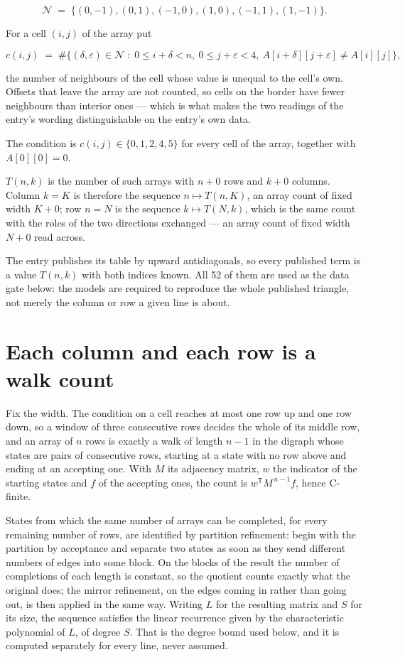 \documentclass[11pt]{article}
\theoremstyle{definition}
\begin{document}
\[\mathcal{N} \;=\; \{(0,-1), (0,1), (-1,0), (1,0), (-1,1), (1,-1)\}.\]

For a cell $(i,j)$ of the array put

\[c(i,j) \;=\; \#\bigl\{(\delta,\varepsilon)\in\mathcal{N} \;:\; 0\le i+\delta<n,\ 0\le j+\varepsilon<4,\ A[i+\delta][j+\varepsilon] \neq A[i][j]\bigr\},\]

the number of neighbours of the cell whose value is unequal to the cell's own. Offsets that leave the array are not counted, so cells on the border have fewer neighbours than interior ones --- which is what makes the two readings of the entry's wording distinguishable on the entry's own data.

The condition is $c(i,j) \in \{0, 1, 2, 4, 5\}$ for every cell of the array, together with $A[0][0]=0$.

$T(n,k)$ is the number of such arrays with $n + 0$ rows and $k + 0$ columns. Column $k = K$ is therefore the sequence $n \mapsto T(n,K)$, an array count of fixed width $K + 0$; row $n = N$ is the sequence $k \mapsto T(N,k)$, which is the same count with the roles of the two directions exchanged --- an array count of fixed width $N + 0$ read across.

The entry publishes its table by upward antidiagonals, so every published term is a value $T(n,k)$ with both indices known. All 52 of them are used as the data gate below: the models are required to reproduce the whole published triangle, not merely the column or row a given line is about.

\section{Each column and each row is a walk count}

Fix the width. The condition on a cell reaches at most one row up and one row down, so a window of three consecutive rows decides the whole of its middle row, and an array of $n$ rows is exactly a walk of length $n-1$ in the digraph whose states are pairs of consecutive rows, starting at a state with no row above and ending at an accepting one. With $M$ its adjacency matrix, $w$ the indicator of the starting states and $f$ of the accepting ones, the count is $w^{\mathsf T}M^{\,n-1}f$, hence C-finite.

States from which the same number of arrays can be completed, for every remaining number of rows, are identified by partition refinement: begin with the partition by acceptance and separate two states as soon as they send different numbers of edges into some block. On the blocks of the result the number of completions of each length is constant, so the quotient counts exactly what the original does; the mirror refinement, on the edges coming in rather than going out, is then applied in the same way. Writing $L$ for the resulting matrix and $S$ for its size, the sequence satisfies the linear recurrence given by the characteristic polynomial of $L$, of degree $S$. That is the degree bound used below, and it is computed separately for every line, never assumed.
\end{document}
